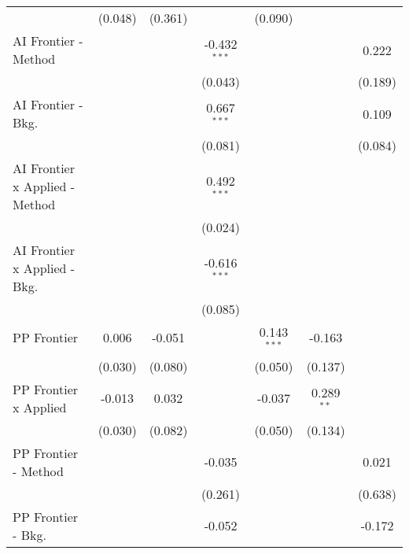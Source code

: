 \begin{tabular}{lcccccc}
                                  & (0.048)        & (0.361)       &                & (0.090)       &              &   \\   
   AI Frontier - Method           &                &               & -0.432$^{***}$ &               &              & 0.222\\   
                                  &                &               & (0.043)        &               &              & (0.189)\\   
   AI Frontier - Bkg.             &                &               & 0.667$^{***}$  &               &              & 0.109\\   
                                  &                &               & (0.081)        &               &              & (0.084)\\   
   AI Frontier x Applied - Method &                &               & 0.492$^{***}$  &               &              &   \\   
                                  &                &               & (0.024)        &               &              &   \\   
   AI Frontier x Applied - Bkg.   &                &               & -0.616$^{***}$ &               &              &   \\   
                                  &                &               & (0.085)        &               &              &   \\   
   PP Frontier                    & 0.006          & -0.051        &                & 0.143$^{***}$ & -0.163       &   \\   
                                  & (0.030)        & (0.080)       &                & (0.050)       & (0.137)      &   \\   
   PP Frontier x Applied          & -0.013         & 0.032         &                & -0.037        & 0.289$^{**}$ &   \\   
                                  & (0.030)        & (0.082)       &                & (0.050)       & (0.134)      &   \\   
   PP Frontier - Method           &                &               & -0.035         &               &              & 0.021\\   
                                  &                &               & (0.261)        &               &              & (0.638)\\   
   PP Frontier - Bkg.             &                &               & -0.052         &               &              & -0.172\\   

\end{tabular}
